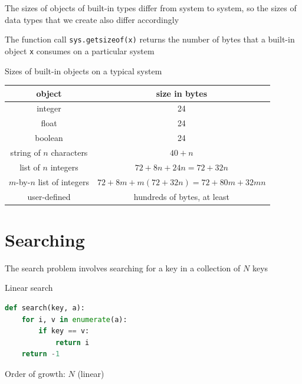 \documentclass[8pt,a4paper,compress]{beamer}
\begin{document}
\begin{frame}[fragile]
\pause

The sizes of objects of built-in types differ from system to system, so the sizes of data types that we create also differ accordingly

\pause
\bigskip

The function call \lstinline{sys.getsizeof(x)} returns the number of bytes that a built-in object \lstinline{x} consumes on a particular system

\pause
\bigskip

Sizes of built-in objects on a typical system
\begin{center}
\begin{tabular}{cc}
object & size in bytes \\ \hline
integer & 24 \\ 
float & 24 \\ 
boolean & 24 \\ 
string of $n$ characters & $40 + n$ \\
list of $n$ integers & $72 + 8n + 24n = 72 + 32n$ \\
$m$-by-$n$ list of integers & $72 + 8m + m(72 + 32n) = 72 + 80m + 32mn$ \\
user-defined & hundreds of bytes, at least
\end{tabular} 
\end{center}
\end{frame}

\section{Searching}
\begin{frame}[fragile]
\pause
The search problem involves searching for a key in a collection of $N$ keys

\pause
\bigskip

Linear search
\begin{lstlisting}[language=Python]
def search(key, a):
    for i, v in enumerate(a):
        if key == v:
            return i
    return -1
\end{lstlisting}

\pause

Order of growth: $N$ (linear)
\end{frame}
\end{document}
